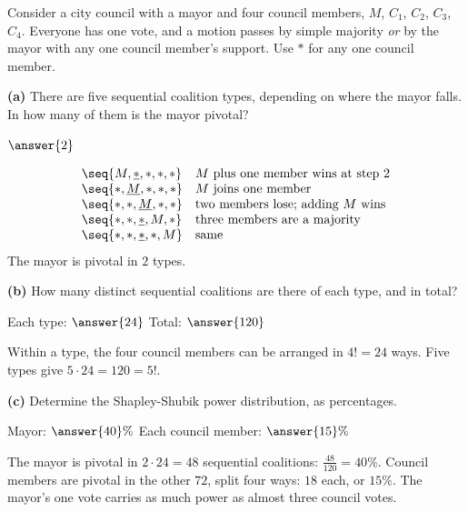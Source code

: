 \documentclass[12pt]{ximera}
\begin{document}
\begin{problem}
Consider a city council with a mayor and four council members, $M$, $C_1$, $C_2$, $C_3$,
$C_4$. Everyone has one vote, and a motion passes by simple majority \emph{or} by the mayor
with any one council member's support. Use $*$ for any one council member.

\begin{prompt}
\textbf{(a)} There are five sequential coalition types, depending on where the mayor
falls. In how many of them is the mayor pivotal?

$\answer{2}$

\begin{feedback}
\[
\begin{array}{ll}
\seq{M,\underline{*},*,*,*} & \text{$M$ plus one member wins at step 2}\\
\seq{*,\underline{M},*,*,*} & \text{$M$ joins one member}\\
\seq{*,*,\underline{M},*,*} & \text{two members lose; adding $M$ wins}\\
\seq{*,*,\underline{*},M,*} & \text{three members are a majority}\\
\seq{*,*,\underline{*},*,M} & \text{same}
\end{array}
\]
The mayor is pivotal in $2$ types.
\end{feedback}
\end{prompt}

\begin{prompt}
\textbf{(b)} How many distinct sequential coalitions are there of each type, and in
total?

Each type: $\answer{24}$ \qquad Total: $\answer{120}$

\begin{feedback}
Within a type, the four council members can be arranged in $4!=24$ ways. Five types
give $5\cdot 24=120=5!$. \checkmark
\end{feedback}
\end{prompt}

\begin{prompt}
\textbf{(c)} Determine the Shapley-Shubik power distribution, as percentages.

Mayor: $\answer{40}\%$ \quad Each council member: $\answer{15}\%$

\begin{feedback}
The mayor is pivotal in $2\cdot 24=48$ sequential coalitions: $\frac{48}{120}=40\%$.
Council members are pivotal in the other $72$, split four ways: $18$ each, or $15\%$.
The mayor's one vote carries as much power as almost three council votes.
\end{feedback}
\end{prompt}
\end{problem}
\end{document}
